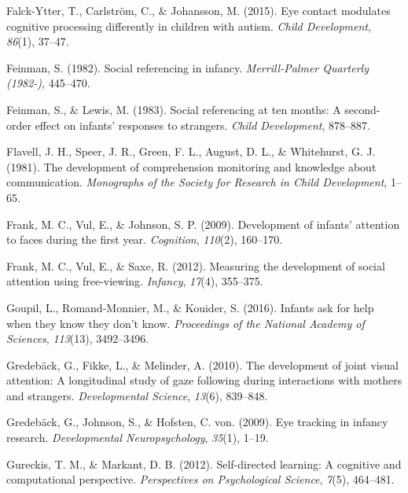 \documentclass[,man,floatsintext]{apa6}
\begin{document}
\leavevmode\hypertarget{ref-falck2015eye}{}%
Falck-Ytter, T., Carlström, C., \& Johansson, M. (2015). Eye contact modulates cognitive processing differently in children with autism. \emph{Child Development}, \emph{86}(1), 37--47.

\leavevmode\hypertarget{ref-feinman1982social}{}%
Feinman, S. (1982). Social referencing in infancy. \emph{Merrill-Palmer Quarterly (1982-)}, 445--470.

\leavevmode\hypertarget{ref-feinman1983social}{}%
Feinman, S., \& Lewis, M. (1983). Social referencing at ten months: A second-order effect on infants' responses to strangers. \emph{Child Development}, 878--887.

\leavevmode\hypertarget{ref-flavell1981development}{}%
Flavell, J. H., Speer, J. R., Green, F. L., August, D. L., \& Whitehurst, G. J. (1981). The development of comprehension monitoring and knowledge about communication. \emph{Monographs of the Society for Research in Child Development}, 1--65.

\leavevmode\hypertarget{ref-frank2009development}{}%
Frank, M. C., Vul, E., \& Johnson, S. P. (2009). Development of infants' attention to faces during the first year. \emph{Cognition}, \emph{110}(2), 160--170.

\leavevmode\hypertarget{ref-frank2012measuring}{}%
Frank, M. C., Vul, E., \& Saxe, R. (2012). Measuring the development of social attention using free-viewing. \emph{Infancy}, \emph{17}(4), 355--375.

\leavevmode\hypertarget{ref-goupil2016infants}{}%
Goupil, L., Romand-Monnier, M., \& Kouider, S. (2016). Infants ask for help when they know they don't know. \emph{Proceedings of the National Academy of Sciences}, \emph{113}(13), 3492--3496.

\leavevmode\hypertarget{ref-gredeback2010development}{}%
Gredebäck, G., Fikke, L., \& Melinder, A. (2010). The development of joint visual attention: A longitudinal study of gaze following during interactions with mothers and strangers. \emph{Developmental Science}, \emph{13}(6), 839--848.

\leavevmode\hypertarget{ref-gredeback2009eye}{}%
Gredebäck, G., Johnson, S., \& Hofsten, C. von. (2009). Eye tracking in infancy research. \emph{Developmental Neuropsychology}, \emph{35}(1), 1--19.

\leavevmode\hypertarget{ref-gureckis2012self}{}%
Gureckis, T. M., \& Markant, D. B. (2012). Self-directed learning: A cognitive and computational perspective. \emph{Perspectives on Psychological Science}, \emph{7}(5), 464--481.
\end{document}
